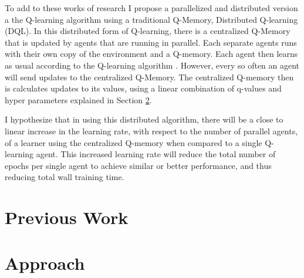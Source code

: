 \documentclass[jair,twoside,11pt,theapa]{article}
\begin{document}
To add to these works of research I propose a parallelized and distributed version a the Q-learning algorithm using a traditional Q-Memory, Distributed Q-learning (DQL).
In this distributed form of Q-learning, there is a centralized Q-Memory that is updated by agents that are running in parallel. Each separate agents runs with their own copy of the environment and a Q-memory. Each agent then learns as usual according to the Q-learning algorithm \cite{watkins}. However, every so often an agent will send updates to the centralized 
Q-Memory. 
The centralized Q-memory then is calculates updates to its values, using a linear combination of q-values and hyper parameters explained in Section \ref{Approach}. 

I hypothesize that in using this distributed algorithm, there will be a close to linear increase in the learning rate, with respect to the number of parallel agents, of a learner using the centralized Q-memory when compared to a single Q-learning agent. This increased learning rate will reduce the total number of epochs per single agent to achieve similar or better performance, and thus reducing total wall training time. 

\section{Previous Work}
\label{Literature Survey}

\section{Approach}
\label{Approach}


\vskip 0.2in


\end{document}
